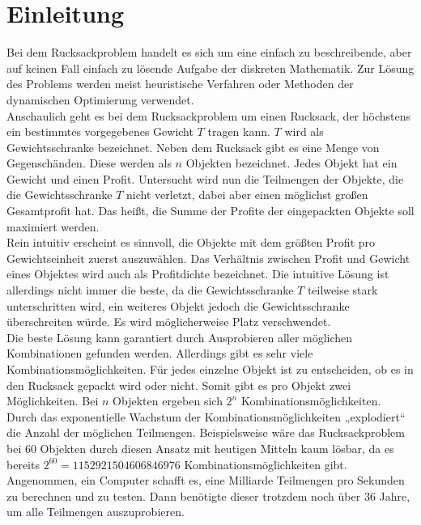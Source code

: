 
\chapter{Einleitung}
Bei dem Rucksackproblem handelt es sich um eine einfach zu beschreibende, aber auf keinen Fall einfach zu lösende Aufgabe der diskreten Mathematik. Zur Lösung des Problems werden meist heuristische Verfahren oder Methoden der dynamischen Optimierung verwendet. \cite[vgl.][]{Luderer2017} \\
Anschaulich geht es bei dem Rucksackproblem um einen Rucksack, der höchstens ein bestimmtes vorgegebenes Gewicht $T$ tragen kann. $T$ wird als Gewichtsschranke bezeichnet. Neben dem Rucksack gibt es eine Menge von Gegenschänden. Diese werden als $n$ Objekten bezeichnet. Jedes Objekt hat ein Gewicht und einen Profit. Untersucht wird nun die Teilmengen der Objekte, die die Gewichtsschranke $T$ nicht verletzt, dabei aber einen möglichst großen Gesamtprofit hat. Das heißt, die Summe der Profite der eingepackten Objekte soll maximiert werden. \\
Rein intuitiv erscheint es sinnvoll, die Objekte mit dem größten Profit pro Gewichtseinheit zuerst auszuwählen. Das Verhältnis zwischen Profit und Gewicht eines Objektes wird auch als Profitdichte bezeichnet. Die intuitive Lösung ist allerdings nicht immer die beste, da die Gewichtsschranke $T$ teilweise stark unterschritten wird, ein weiteres Objekt jedoch die Gewichtsschranke überschreiten würde. Es wird möglicherweise Platz verschwendet.\\
Die beste Lösung kann garantiert durch Ausprobieren aller möglichen Kombinationen gefunden werden. Allerdings gibt es sehr viele Kombinationsmöglichkeiten. Für jedes einzelne Objekt ist zu entscheiden, ob es in den Rucksack gepackt wird oder nicht. Somit gibt es pro Objekt zwei Möglichkeiten. Bei $n$ Objekten ergeben sich $2^n$ Kombinationsmöglichkeiten. Durch das exponentielle Wachstum der Kombinationsmöglichkeiten „explodiert“ die Anzahl der möglichen Teilmengen. Beispielsweise wäre das Rucksackproblem bei 60 Objekten durch diesen Ansatz mit heutigen Mitteln kaum lösbar, da es bereits $2^{60} = 1 152 921 504 606 846 976$ Kombinationsmöglichkeiten gibt. Angenommen, ein Computer schafft es, eine Milliarde Teilmengen pro Sekunden zu berechnen und zu testen. Dann benötigte dieser trotzdem noch über 36 Jahre, um alle Teilmengen auszuprobieren. \cite[vgl.][]{Vocking2008} \\


